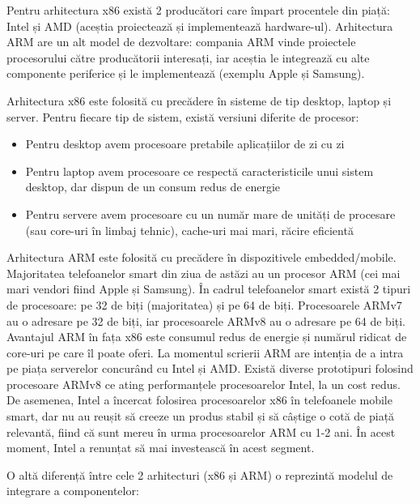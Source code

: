 \begin{itemize}

\end{itemize}

Pentru arhitectura x86 există 2 producători care împart procentele din piață:
Intel și AMD (aceștia proiectează și implementează hardware-ul). Arhitectura ARM
are un alt model de dezvoltare: compania ARM vinde proiectele procesorului către
producătorii interesați, iar aceștia le integrează cu alte componente periferice
și le implementează (exemplu Apple și Samsung).

Arhitectura x86 este folosită cu precădere în sisteme de tip desktop, laptop și
server. Pentru fiecare tip de sistem, există versiuni diferite de procesor:

\begin{itemize}
	\item Pentru desktop avem procesoare pretabile aplicațiilor de zi cu zi
	\item Pentru laptop avem procesoare ce respectă caracteristicile unui
		sistem desktop, dar dispun de un consum redus de energie
	\item Pentru servere avem procesoare cu un număr mare de unități de
		procesare (sau core-uri în limbaj tehnic), cache-uri mai mari,
		răcire eficientă
\end{itemize}

Arhitectura ARM este folosită cu precădere în dispozitivele embedded/mobile.
Majoritatea telefoanelor smart din ziua de astăzi au un procesor ARM (cei mai
mari vendori fiind Apple și Samsung). În cadrul telefoanelor smart există 2
tipuri de procesoare: pe 32 de biți (majoritatea) și pe 64 de biți. Procesoarele
ARMv7 au o adresare pe 32 de biți, iar procesoarele ARMv8 au o adresare pe 64 de
biți. Avantajul ARM în fața x86 este consumul redus de energie și numărul
ridicat de core-uri pe care îl poate oferi. La momentul scrierii ARM are
intenția de a intra pe piața serverelor concurând cu Intel și AMD. Există
diverse prototipuri folosind procesoare ARMv8 ce ating performanțele
procesoarelor Intel, la un cost redus. De asemenea, Intel a încercat folosirea
procesoarelor x86 în telefoanele mobile smart, dar nu au reușit să creeze un
produs stabil și să câștige o cotă de piață relevantă, fiind că sunt mereu în
urma procesoarelor ARM cu 1-2 ani. În acest moment, Intel a renunțat să mai
investească în acest segment.

O altă diferență între cele 2 arhitecturi (x86 și ARM) o reprezintă modelul de
integrare a componentelor:

